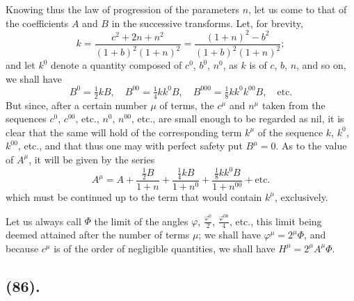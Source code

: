 \documentclass{article}
\begin{document}
Knowing thus the law of progression of the parameters $n$, let us come to that of the coefficients $A$ and $B$ in the successive transforms. Let, for brevity,
\[ k=\frac{c^{2}+2n+n^{2}}{(1+b)^{2}(1+n)^{2}}=\frac{(1+n)^{2}-b^{2}}{(1+b)^{2}(1+n)^{2}}; \]
and let $k^{0}$ denote a quantity composed of $c^{0}$, $b^{0}$, $n^{0}$, as $k$ is of $c$, $b$, $n$, and so on, we shall have
\[ B^{0}=\tfrac{1}{2}kB,\quad B^{00}=\tfrac{1}{4}kk^{0}B,\quad B^{000}=\tfrac{1}{8}kk^{0}k^{00}B,\quad\text{etc.} \]
But since, after a certain number $\mu$ of terms, the $c^{\mu}$ and $n^{\mu}$ taken from the sequences $c^{0}$, $c^{00}$, etc., $n^{0}$, $n^{00}$, etc., are small enough to be regarded as nil, it is clear that the same will hold of the corresponding term $k^{\mu}$ of the sequence $k$, $k^{0}$, $k^{00}$, etc., and that thus one may with perfect safety put $B^{\mu}=0$. As to the value of $A^{\mu}$, it will be given by the series
\[ A^{\mu}=A+\frac{\tfrac{1}{2}B}{1+n}+\frac{\tfrac{1}{4}kB}{1+n^{0}}+\frac{\tfrac{1}{8}kk^{0}B}{1+n^{00}}+\text{etc.} \]
which must be continued up to the term that would contain $k^{\mu}$, exclusively.

Let us always call $\Phi$ the limit of the angles $\varphi$, $\frac{\varphi^{0}}{2}$, $\frac{\varphi^{00}}{4}$, etc., this limit being deemed attained after the number of terms $\mu$; we shall have $\varphi^{\mu}=2^{\mu}\Phi$, and because $c^{\mu}$ is of the order of negligible quantities, we shall have $H^{\mu}=2^{\mu}A^{\mu}\Phi$.

\subsection*{(86).}
\end{document}
